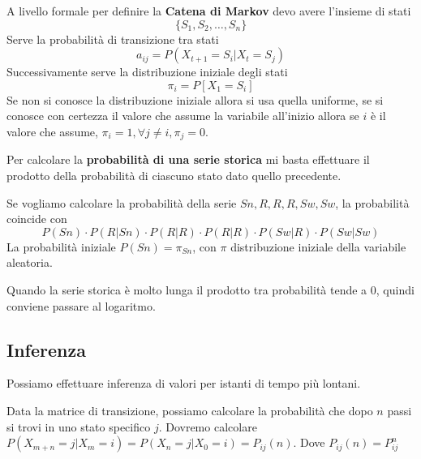 A livello formale per definire la \textbf{Catena di Markov} devo avere l'insieme 
di stati $$\{S_1,S_2,\dots, S_n\}$$
Serve la probabilità di transizione tra stati
$$a_{ij} = P(X_{t+1} = S_i | X_t = S_j)$$
Successivamente serve la distribuzione iniziale degli stati
$$\pi_i = P[X_1 = S_i]$$
Se non si conosce la distribuzione iniziale allora si usa quella uniforme, se 
si conosce con certezza il valore che assume la variabile all'inizio allora se $i$
è il valore che assume, $\pi_i = 1, \forall j \ne i, \pi_j=0$.

Per calcolare la \textbf{probabilità di una serie storica} mi basta effettuare 
il prodotto della probabilità di ciascuno stato dato quello precedente.
\begin{esempio}
    Se vogliamo calcolare la probabilità della serie $Sn, R,R,R,Sw,Sw$, la probabilità 
    coincide con 
    $$P(Sn) \cdot P(R|Sn) \cdot P(R|R)\cdot P(R|R)\cdot P(Sw|R) \cdot P(Sw|Sw)$$
    La probabilità iniziale $P(Sn) = \pi_{Sn}$, con $\pi$ distribuzione iniziale 
    della variabile aleatoria.
\end{esempio}

Quando la serie storica è molto lunga il prodotto tra probabilità tende a $0$, quindi 
conviene passare al logaritmo.

\subsection{Inferenza}

Possiamo effettuare inferenza di valori per istanti di tempo più lontani.

Data la matrice di transizione, possiamo calcolare la probabilità che dopo $n$ 
passi si trovi in uno stato specifico $j$. Dovremo calcolare $P(X_{m+n} = j | X_{m}=i) = P(X_n=j | X_0=i)=P_{ij}(n)$.
Dove $P_{ij}(n) = P^n_{ij}$ 